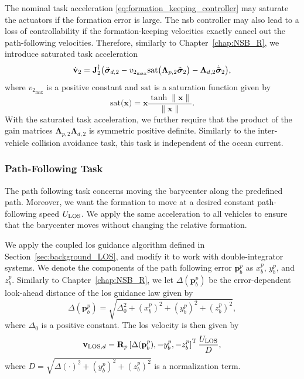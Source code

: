 The nominal task acceleration \eqref{eq:formation_keeping_controller} may saturate the actuators if the formation error is large. The \gls{nsb} controller may also lead to a loss of controllability if the formation-keeping velocities exactly cancel out the path-following velocities. Therefore, similarly to Chapter~\ref{chap:NSB_R}, we introduce saturated task acceleration
\begin{equation}\label{eq:saturated_formation_keeping}
\dot{\mathbf{v}}_2 = \mathbf{J}_2^\dagger \bigl(\ddot{\bm{\sigma}}_{d,2} - v_{2_{\max}}\mathrm{sat}\bigl(\mathbf{\Lambda}_{p,2}\Tilde{\bm{\sigma}}_2\bigr) - \mathbf{\Lambda}_{d,2} \dot{\Tilde{\bm{\sigma}}}_2\bigr),
\end{equation}
where $v_{2_{\max}}$ is a positive constant and $\mathrm{sat}$ is a saturation function given by
\begin{equation}
    \mathrm{sat}\bigl(\mathbf{x}\bigr) = \mathbf{x}\frac{\tanh{\|\mathbf{x}\|}}{\|\mathbf{x}\|}.
\end{equation}
With the saturated task acceleration, we further require that the product of the gain matrices $\mathbf{\Lambda}_{p,2} \mathbf{\Lambda}_{d,2}$ is symmetric positive definite.
Similarly to the inter-vehicle collision avoidance task, this task is independent of the ocean current.%

\subsubsection{Path-Following Task}
The path following task concerns moving the barycenter along the predefined path. Moreover, we want the formation to move at a desired constant path-following speed $U_{\rm LOS}$. We apply the same acceleration to all vehicles to ensure that the barycenter moves without changing the relative formation.

We apply the coupled \acrfull{los} guidance algorithm defined in Section~\ref{sec:background_LOS}, and modify it to work with double-integrator systems. We denote the components of the path following error $\mathbf{p}_b^p$ as $x_b^p$, $y_b^p$, and $z_b^p$. Similarly to Chapter~\ref{chap:NSB_R}, we let $\Delta(\mathbf{p}_b^p)$ be the error-dependent look-ahead distance of the \gls{los} guidance law given by
\begin{equation}
    \Delta(\mathbf{p}_b^p) = \sqrt{\Delta_0^2 + (x_b^p)^2 + (y_b^p)^2 + (z_b^p)^2},
\end{equation}
where $\Delta_0$ is a positive constant. The \gls{los} velocity is then given by
\begin{equation}\label{eq:desired_LOS}
    \mathbf{v}_{{\rm LOS}, d} = \mathbf{R}_p \left[ \Delta(\mathbf{p}_b^p), -y_b^p, -z_b^p \right]^{\mathrm{T}} \frac{U_{\rm LOS}}{D},
\end{equation}
where 
$
    D = \sqrt{\Delta(\cdot)^2 + (y_b^p)^2 + (z_b^p)^2}
$
is a normalization term.

